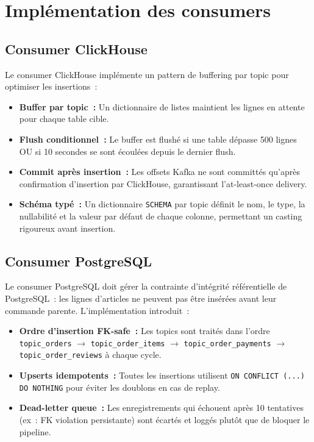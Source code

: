 \section{Implémentation des consumers}

\subsection{Consumer ClickHouse}

Le consumer ClickHouse implémente un pattern de buffering par topic pour optimiser les insertions~:

\begin{itemize}
  \setlength{\itemsep}{0.4em}
  \item \textbf{Buffer par topic~:} Un dictionnaire de listes maintient les lignes en attente pour chaque table cible.
  \item \textbf{Flush conditionnel~:} Le buffer est flushé si une table dépasse 500 lignes OU si 10 secondes se sont écoulées depuis le dernier flush.
  \item \textbf{Commit après insertion~:} Les offsets Kafka ne sont committés qu'après confirmation d'insertion par ClickHouse, garantissant l'at-least-once delivery.
  \item \textbf{Schéma typé~:} Un dictionnaire \texttt{SCHEMA} par topic définit le nom, le type, la nullabilité et la valeur par défaut de chaque colonne, permettant un casting rigoureux avant insertion.
\end{itemize}

\subsection{Consumer PostgreSQL}

Le consumer PostgreSQL doit gérer la contrainte d'intégrité référentielle de PostgreSQL~: les lignes d'articles ne peuvent pas être insérées avant leur commande parente. L'implémentation introduit~:

\begin{itemize}
  \setlength{\itemsep}{0.4em}
  \item \textbf{Ordre d'insertion FK-safe~:} Les topics sont traités dans l'ordre \texttt{topic\_orders} $\rightarrow$ \texttt{topic\_order\_items} $\rightarrow$ \texttt{topic\_order\_payments} $\rightarrow$ \texttt{topic\_order\_reviews} à chaque cycle.
  \item \textbf{Upserts idempotents~:} Toutes les insertions utilisent \texttt{ON CONFLICT (...) DO NOTHING} pour éviter les doublons en cas de replay.
  \item \textbf{Dead-letter queue~:} Les enregistrements qui échouent après 10 tentatives (ex~: FK violation persistante) sont écartés et loggés plutôt que de bloquer le pipeline.
\end{itemize}

